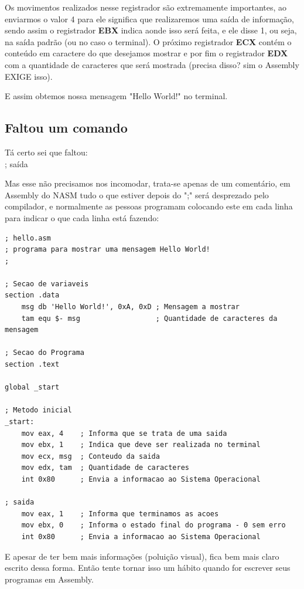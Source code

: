 Os movimentos realizados nesse registrador são extremamente importantes, ao enviarmos o valor 4 para ele significa que realizaremos uma saída de informação, sendo assim o registrador \textbf{EBX} indica aonde isso será feita, e ele disse 1, ou seja, na saída padrão (ou no caso o terminal). O próximo registrador \textbf{ECX} contém o conteúdo em caractere do que desejamos mostrar e por fim o registrador \textbf{EDX} com a quantidade de caracteres que será mostrada (precisa disso? sim o Assembly EXIGE isso).

E assim obtemos nossa mensagem "Hello World!" no terminal.

\subsection{Faltou um comando}

Tá certo sei que faltou: \\
{\ttfamily ; saída}

Mas esse não precisamos nos incomodar, trata-se apenas de um comentário, em Assembly do NASM tudo o que estiver depois do ";" será desprezado pelo compilador, e normalmente as pessoas programam colocando este em cada linha para indicar o que cada linha está fazendo:
\begin{lstlisting}[]
; hello.asm
; programa para mostrar uma mensagem Hello World!
;

; Secao de variaveis
section .data
	msg db 'Hello World!', 0xA, 0xD ; Mensagem a mostrar
	tam equ $- msg                  ; Quantidade de caracteres da mensagem
	
; Secao do Programa	
section .text
	
global _start
	
; Metodo inicial	
_start:
	mov eax, 4    ; Informa que se trata de uma saida
	mov ebx, 1    ; Indica que deve ser realizada no terminal
	mov ecx, msg  ; Conteudo da saida
	mov edx, tam  ; Quantidade de caracteres
	int 0x80      ; Envia a informacao ao Sistema Operacional
	
; saida
	mov eax, 1    ; Informa que terminamos as acoes
	mov ebx, 0    ; Informa o estado final do programa - 0 sem erro
	int 0x80      ; Envia a informacao ao Sistema Operacional
\end{lstlisting}
 
E apesar de ter bem mais informações (poluição visual), fica bem mais claro escrito dessa forma. Então tente tornar isso um hábito quando for escrever seus programas em Assembly.

